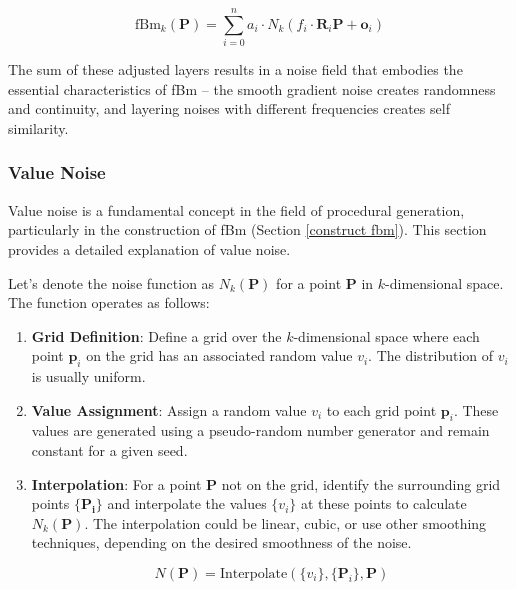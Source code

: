 \begin{equation}
    \text{fBm}_k(\mathbf{P}) = \sum_{i=0}^{n} a_i \cdot N_k(f_i \cdot \mathbf{R}_i\mathbf{P} + \mathbf{o}_i)
\end{equation}

The sum of these adjusted layers results in a noise field that embodies the essential characteristics of fBm -- the smooth gradient noise creates randomness and continuity, and layering noises with different frequencies creates self similarity.

\subsubsection{Value Noise}
\label{value noise}


Value noise is a fundamental concept in the field of procedural generation, particularly in the construction of fBm (Section \ref{construct fbm}). This section provides a detailed explanation of value noise.

Let's denote the noise function as $N_k(\mathbf{P})$ for a point $\mathbf{P}$ in $k$-dimensional space. The function operates as follows:

\begin{enumerate}
    \item \textbf{Grid Definition}: Define a grid over the $k$-dimensional space where each point $\mathbf{p}_i$ on the grid has an associated random value $v_i$. The distribution of $v_i$ is usually uniform.

    \item \textbf{Value Assignment}: Assign a random value $v_i$ to each grid point $\mathbf{p}_i$. These values are generated using a pseudo-random number generator and remain constant for a given seed.

    \item \textbf{Interpolation}: For a point $\mathbf{P}$ not on the grid, identify the surrounding grid points $\{\mathbf{P_{i}\}}$ and interpolate the values $\{v_i\}$ at these points to calculate $N_k(\mathbf{P})$. The interpolation could be linear, cubic, or use other smoothing techniques, depending on the desired smoothness of the noise.
    
    \begin{equation}
        N(\mathbf{P}) = \text{Interpolate}(\{v_i\}, \{\mathbf{P}_i\}, \mathbf{P}) 
    \end{equation}
\end{enumerate}


